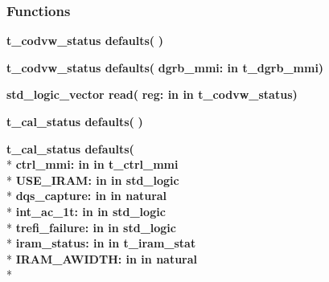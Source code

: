 \subsubsection*{Functions}
 \begin{DoxyCompactItemize}
\item 
{\bfseries {\bfseries \textcolor{vhdlchar}{t\+\_\+codvw\+\_\+status}\textcolor{vhdlchar}{ }}} {\bf defaults}{\bfseries  ( }{\bfseries  )} 
\item 
{\bfseries {\bfseries \textcolor{vhdlchar}{t\+\_\+codvw\+\_\+status}\textcolor{vhdlchar}{ }}} {\bf defaults}{\bfseries  ( }{\bfseries \textcolor{vhdlchar}{dgrb\+\_\+mmi\+: }\textcolor{stringliteral}{in }\textcolor{vhdlchar}{t\+\_\+dgrb\+\_\+mmi}}{\bfseries  )} 
\item 
{\bfseries {\bfseries \textcolor{comment}{std\+\_\+logic\+\_\+vector}\textcolor{vhdlchar}{ }}} {\bf read}{\bfseries  ( }{\bfseries \textcolor{vhdlchar}{reg\+: }\textcolor{stringliteral}{in }\textcolor{vhdlchar}{in t\+\_\+codvw\+\_\+status}}{\bfseries  )} 
\item 
{\bfseries {\bfseries \textcolor{vhdlchar}{t\+\_\+cal\+\_\+status}\textcolor{vhdlchar}{ }}} {\bf defaults}{\bfseries  ( }{\bfseries  )} 
\item 
{\bfseries {\bfseries \textcolor{vhdlchar}{t\+\_\+cal\+\_\+status}\textcolor{vhdlchar}{ }}} {\bf defaults}{\bfseries  ( }\\*
{\bfseries \textcolor{vhdlchar}{ctrl\+\_\+mmi\+: }\textcolor{stringliteral}{in }\textcolor{vhdlchar}{in t\+\_\+ctrl\+\_\+mmi}}\\*
{\bfseries \textcolor{vhdlchar}{U\+S\+E\+\_\+\+I\+R\+A\+M\+: }\textcolor{stringliteral}{in }\textcolor{vhdlchar}{in std\+\_\+logic}}\\*
{\bfseries \textcolor{vhdlchar}{dqs\+\_\+capture\+: }\textcolor{stringliteral}{in }\textcolor{vhdlchar}{in natural}}\\*
{\bfseries \textcolor{vhdlchar}{int\+\_\+ac\+\_\+1t\+: }\textcolor{stringliteral}{in }\textcolor{vhdlchar}{in std\+\_\+logic}}\\*
{\bfseries \textcolor{vhdlchar}{trefi\+\_\+failure\+: }\textcolor{stringliteral}{in }\textcolor{vhdlchar}{in std\+\_\+logic}}\\*
{\bfseries \textcolor{vhdlchar}{iram\+\_\+status\+: }\textcolor{stringliteral}{in }\textcolor{vhdlchar}{in t\+\_\+iram\+\_\+stat}}\\*
{\bfseries \textcolor{vhdlchar}{I\+R\+A\+M\+\_\+\+A\+W\+I\+D\+T\+H\+: }\textcolor{stringliteral}{in }\textcolor{vhdlchar}{in natural}}\\*

\end{DoxyCompactItemize}
